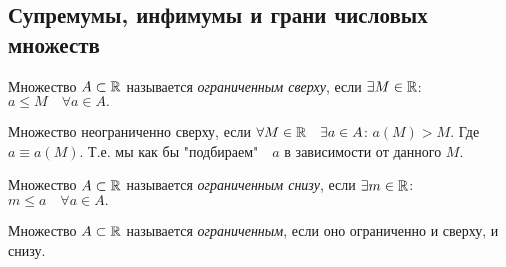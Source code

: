     \newpage
    \subsection{Супремумы, инфимумы и грани числовых множеств}

    \begin{definition}
        Множество $A \subset \mathbb{R}$ называется \textit{ограниченным сверху}, если $\exists M \in \mathbb{R}$: $a \leq M \quad \forall a \in A.$
    \end{definition}
    \begin{note}
        Множество неограниченно сверху, если $\forall M \in \mathbb{R} \quad \exists a \in A$: $a(M) > M.$ Где $a \equiv a(M).$ Т.е. мы как бы "подбираем" $\text{ }a$ в зависимости от данного $M.$
    \end{note}
    \begin{definition}
        Множество $A \subset \mathbb{R}$ называется \textit{ограниченным снизу}, если $\exists m \in \mathbb{R}$: $m \leq a  \quad \forall a \in A.$
    \end{definition}
    \begin{definition}
        Множество $A \subset \mathbb{R}$ называется \textit{ограниченным}, если оно ограниченно и сверху, и снизу.
    \end{definition}
